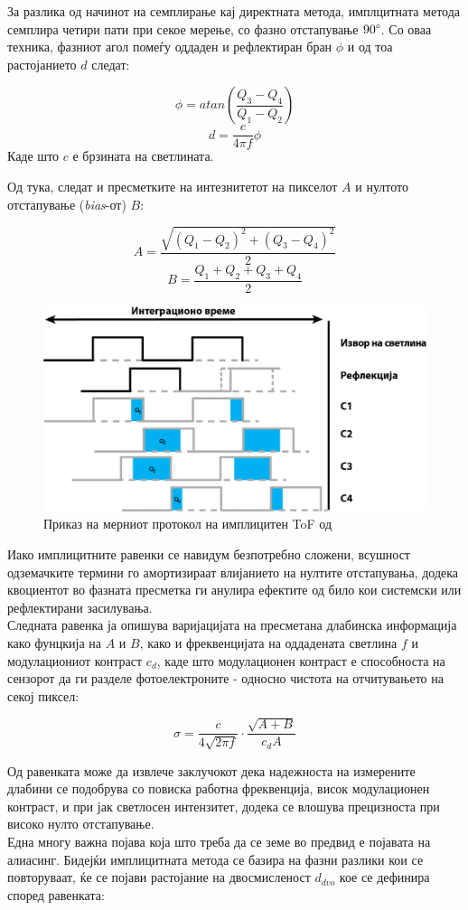 \documentclass[12pt]{article}
\begin{document}
		За разлика од начинот на семплирање кај директната метода, имплцитната метода семплира четири пати при секое мерење, со фазно отстапување $90\degree$. Со оваа техника, фазниот агол помеѓу оддаден и рефлектиран бран $\phi$ и од тоа растојанието $d$ следат:

		$$ \phi = atan(\frac{Q_3 - Q_4}{Q_1 - Q_2}) $$
		$$ d = \frac{c}{4\pi f} \phi $$
		Каде што $c$ е брзината на светлината.


		Од тука, следат и пресметките на интезнитетот на пикселот $A$ и нултото отстапување (\textit{bias}-от) $B$:

		$$ A = \frac{\sqrt{(Q_1 - Q_2)^2  + (Q_3 - Q_4)^2}}{2} $$
		$$ B = \frac{Q_1 + Q_2 + Q_3 + Q_4}{2} $$


		\begin{figure}[H]
			\includegraphics[width=0.75\linewidth]{./images/CWToF.png}
			\centering
			\caption{Приказ на мерниот протокол на имплицитен ToF од \cite{tofwhitepaper}}
			\label{fig:CWToF.png}
			\end{figure}

		Иако имплицитните равенки се навидум безпотребно сложени, всушност одземачките термини го амортизираат влијанието на нултите отстапувања, додека квоциентот во фазната пресметка ги анулира ефектите од било кои системски или рефлектирани засилувања.\\ %
		Следната равенка ја опишува варијацијата на пресметана длабинска информација како фунцкија на $A$ и $B$, како и фреквенцијата на оддадената светлина $f$ и модулациониот контраст $c_d$, каде што модулационен контраст е способноста на сензорот да ги разделе фотоелектроните - односно чистота на отчитувањето на секој пиксел:

		$$ \sigma = \frac{c}{4\sqrt{2\pi f}} \cdot \frac{\sqrt{A+B}}{c_d A} $$

		Од равенката може да извлече заклучокот дека надежноста на измерените длабини се подобрува со повиска работна фреквенција, висок модулационен контраст, и при јак светлосен интензитет, додека се влошува прецизноста при високо нулто отстапување.
		\\
		Една многу важна појава која што треба да се земе во предвид е појавата на алиасинг. Бидејќи имплицитната метода се базира на фазни разлики кои се повторуваат, ќе се појави растојание на двосмисленост $d_{dvo}$ кое се дефинира според равенката:
\end{document}
